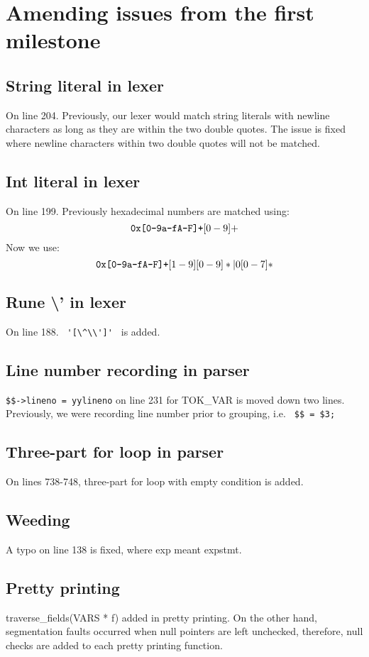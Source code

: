 \documentclass{article}
\begin{document}
\section{Amending issues from the first milestone}


\subsection{String literal in lexer}
On line 204. Previously, our lexer would match string literals with newline characters as long as they are within the two double quotes. The issue is fixed where newline characters within two double quotes will not be matched.

\subsection{Int literal in lexer}
On line 199. Previously hexadecimal numbers are matched using:
\[
        \verb|0x[0-9a-fA-F]+|[0-9]+
\]
Now we use:
\[
        \verb|0x[0-9a-fA-F]+|[1-9][0-9]*|0[0-7]*
\]

\subsection{Rune \textbackslash{}' in lexer}
On line 188. \verb| '[\^\\']' | is added.

\subsection{Line number recording in parser}
\verb|$$->lineno = yylineno| on line 231 for TOK\_VAR is moved down two lines. Previously, we were recording line number prior to grouping, i.e. \verb| $$ = $3; |

\subsection{Three-part for loop in parser}
On lines 738-748, three-part for loop with empty condition is added.

\subsection{Weeding}
A typo on line 138 is fixed, where exp meant expstmt.

\subsection{Pretty printing}
traverse\_fields(VARS * f) added in pretty printing. On the other hand, segmentation faults occurred when null pointers are left unchecked, therefore, null checks are added to each pretty printing function.
\end{document}

